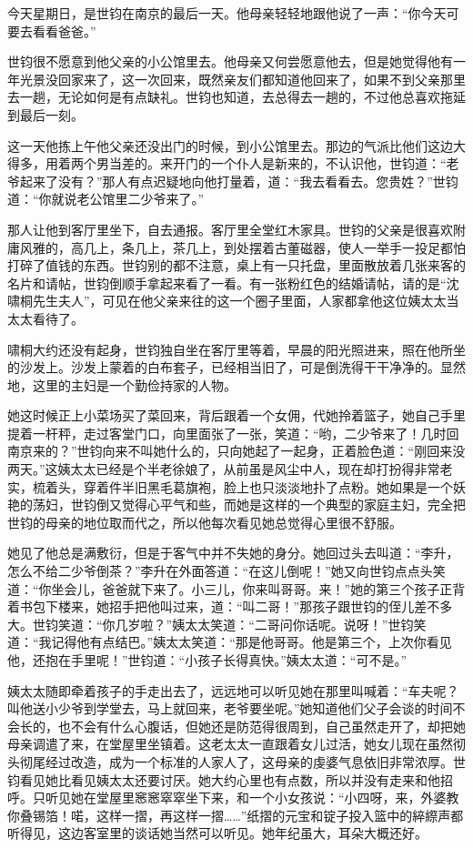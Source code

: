 \par 今天星期日，是世钧在南京的最后一天。他母亲轻轻地跟他说了一声：“你今天可要去看看爸爸。”
\par 世钧很不愿意到他父亲的小公馆里去。他母亲又何尝愿意他去，但是她觉得他有一年光景没回家来了，这一次回来，既然亲友们都知道他回来了，如果不到父亲那里去一趟，无论如何是有点缺礼。世钧也知道，去总得去一趟的，不过他总喜欢拖延到最后一刻。
\par 这一天他拣上午他父亲还没出门的时候，到小公馆里去。那边的气派比他们这边大得多，用着两个男当差的。来开门的一个仆人是新来的，不认识他，世钧道：“老爷起来了没有？”那人有点迟疑地向他打量着，道：“我去看看去。您贵姓？”世钧道：“你就说老公馆里二少爷来了。”
\par 那人让他到客厅里坐下，自去通报。客厅里全堂红木家具。世钧的父亲是很喜欢附庸风雅的，高几上，条几上，茶几上，到处摆着古董磁器，使人一举手一投足都怕打碎了值钱的东西。世钧别的都不注意，桌上有一只托盘，里面散放着几张来客的名片和请帖，世钧倒顺手拿起来看了一看。有一张粉红色的结婚请帖，请的是“沈啸桐先生夫人”，可见在他父亲来往的这一个圈子里面，人家都拿他这位姨太太当太太看待了。
\par 啸桐大约还没有起身，世钧独自坐在客厅里等着，早晨的阳光照进来，照在他所坐的沙发上。沙发上蒙着的白布套子，已经相当旧了，可是倒洗得干干净净的。显然地，这里的主妇是一个勤俭持家的人物。
\par 她这时候正上小菜场买了菜回来，背后跟着一个女佣，代她拎着篮子，她自己手里提着一杆秤，走过客堂门口，向里面张了一张，笑道：“哟，二少爷来了！几时回南京来的？”世钧向来不叫她什么的，只向她起了一起身，正着脸色道：“刚回来没两天。”这姨太太已经是个半老徐娘了，从前虽是风尘中人，现在却打扮得非常老实，梳着头，穿着件半旧黑毛葛旗袍，脸上也只淡淡地扑了点粉。她如果是一个妖艳的荡妇，世钧倒又觉得心平气和些，而她是这样的一个典型的家庭主妇，完全把世钧的母亲的地位取而代之，所以他每次看见她总觉得心里很不舒服。
\par 她见了他总是满敷衍，但是于客气中并不失她的身分。她回过头去叫道：“李升，怎么不给二少爷倒茶？”李升在外面答道：“在这儿倒呢！”她又向世钧点点头笑道：“你坐会儿，爸爸就下来了。小三儿，你来叫哥哥。来！”她的第三个孩子正背着书包下楼来，她招手把他叫过来，道：“叫二哥！”那孩子跟世钧的侄儿差不多大。世钧笑道：“你几岁啦？”姨太太笑道：“二哥问你话呢。说呀！”世钧笑道：“我记得他有点结巴。”姨太太笑道：“那是他哥哥。他是第三个，上次你看见他，还抱在手里呢！”世钧道：“小孩子长得真快。”姨太太道：“可不是。”
\par 姨太太随即牵着孩子的手走出去了，远远地可以听见她在那里叫喊着：“车夫呢？叫他送小少爷到学堂去，马上就回来，老爷要坐呢。”她知道他们父子会谈的时间不会长的，也不会有什么心腹话，但她还是防范得很周到，自己虽然走开了，却把她母亲调遣了来，在堂屋里坐镇着。这老太太一直跟着女儿过活，她女儿现在虽然彻头彻尾经过改造，成为一个标准的人家人了，这母亲的虔婆气息依旧非常浓厚。世钧看见她比看见姨太太还要讨厌。她大约心里也有点数，所以并没有走来和他招呼。只听见她在堂屋里窸窸窣窣坐下来，和一个小女孩说：“小四呀，来，外婆教你叠锡箔！喏，这样一摺，再这样一摺……”纸摺的元宝和锭子投入篮中的綷縩声都听得见，这边客室里的谈话她当然可以听见。她年纪虽大，耳朵大概还好。
